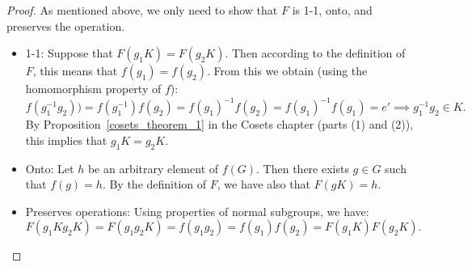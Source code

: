 \begin{proof}
As mentioned above, we only need to show that $F$ is 1-1, onto, and preserves the operation.
\begin{itemize}
\item
1-1: Suppose that $F(g_1K) = F(g_2K)$.  Then according to the definition of $F$, this means that
$f(g_1) = f(g_2)$. From this we obtain (using the homomorphism property of $f$):
\[ f(g_1^{-1}g_2)) = f(g_1^{-1})f(g_2) =  f(g_1)^{-1}f(g_2) = f(g_1)^{-1}f(g_1) = e'  \implies g_1^{-1}g_2 \in K.\]
By Proposition~\ref{cosets_theorem_1} in the Cosets chapter (parts (1) and (2)), this implies that $g_1K = g_2K$.
\item
Onto:  Let $h$ be an arbitrary element of $f(G)$. Then there exists $g \in G$ such that $f(g)=h$.  By the definition of $F$, we have
also that $F(gK) = h$.
\item
Preserves operations: Using properties of normal subgroups, we have:
\[F(g_1Kg_2K) = F(g_1g_2K) = f(g_1g_2) = f(g_1)f(g_2) = F(g_1K)F(g_2K).\]
\end{itemize}
\end{proof}

% 
% 
%
%
%
%
%
%
%
%
 
